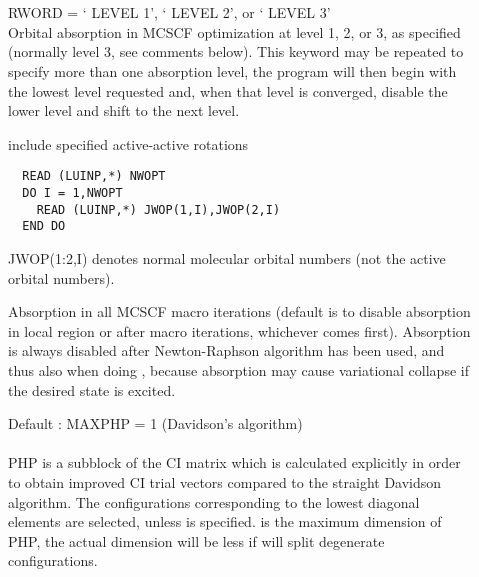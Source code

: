 \begin{description}
\item[] \ \\
   \\
  RWORD = ` LEVEL 1', ` LEVEL 2', or ` LEVEL 3'\\
  Orbital absorption in MCSCF optimization
  at level 1, 2, or 3, as specified
  (normally level 3, see comments below).  This keyword may be repeated to
  specify more than one absorption level, the program will then begin with
  the lowest level requested and, when that level is converged,
  disable the lower level and shift to the next level.

\item[]
  include specified active-active rotations
\begin{verbatim}
  READ (LUINP,*) NWOPT
  DO I = 1,NWOPT
    READ (LUINP,*) JWOP(1,I),JWOP(2,I)
  END DO
\end{verbatim}
  JWOP(1:2,I) denotes normal molecular orbital numbers (not the active
  orbital numbers).

\item[]
  Absorption in all MCSCF macro iterations
  (default is to disable absorption in
  local region or after  macro iterations, whichever comes first).
  Absorption is always disabled after Newton-Raphson algorithm has been used,
  and thus also when doing ,
  because absorption may cause variational collapse if the desired state is excited.

\item[]
  Default : MAXPHP = 1 (Davidson's algorithm)\\
   \\
  PHP is a subblock of the CI matrix which is calculated explicitly
  in order to obtain improved CI trial vectors compared to the
  straight Davidson algorithm.  The
  configurations corresponding to
  the lowest diagonal elements are selected, unless
   is specified.
   is the maximum dimension of PHP, the actual dimension
  will be less if  will split degenerate configurations.


\end{description}
